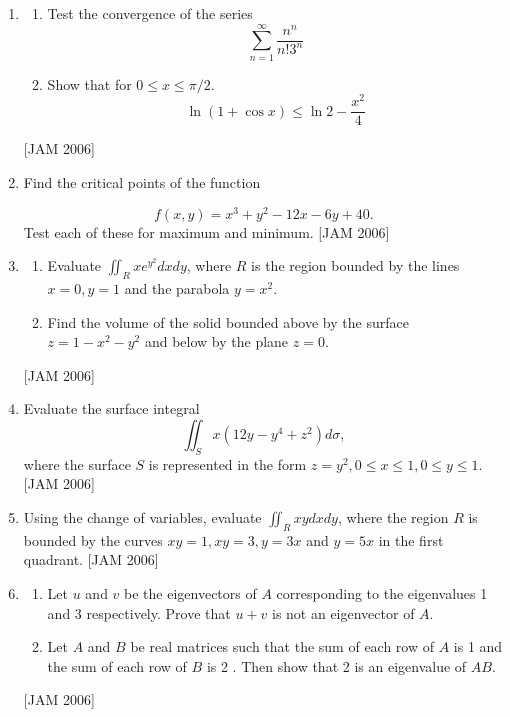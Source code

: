 \begin{enumerate}
\item 
\begin{enumerate}
  \item   Test the convergence of the series
$$
\sum_{n=1}^{\infty} \frac{n^{n}}{n ! 3^{n}}
$$
\item  Show that for $0 \leq x \leq \pi / 2$.
$$
\ln (1+\cos x) \leq \ln 2-\frac{x^{2}}{4}
$$
\end{enumerate}
 \hfill [JAM 2006]

 
\item Find the critical points of the function

$$
f(x, y)=x^{3}+y^{2}-12 x-6 y+40 .
$$
Test each of these for maximum and minimum.
 \hfill [JAM 2006]

 


\item 
\begin{enumerate}
  \item  Evaluate $\iint_{R} x e^{y^{2}} d x d y$, where $R$ is the region bounded by the lines $x=0, y=1$ and the parabola $y=x^{2}$.

\item Find the volume of the solid bounded above by the surface $z=1-x^{2}-y^{2}$ and below by the plane $z=0$.
\end{enumerate}
 \hfill [JAM 2006]



\item
Evaluate the surface integral
$$
\iint_{S} x\left(12 y-y^{4}+z^{2}\right) d \sigma,
$$
where the surface $S$ is represented in the form $z=y^{2}, 0 \leq x \leq 1,0 \leq y \leq 1$.
 \hfill [JAM 2006]

\item Using the change of variables, evaluate $\iint_{R} x y d x d y$, where the region $R$ is bounded by the curves $x y=1, x y=3, y=3 x$ and $y=5 x$ in the first quadrant.
 \hfill [JAM 2006]




\item 
\begin{enumerate}
\item  Let $u$ and $v$ be the eigenvectors of $A$ corresponding to the eigenvalues 1 and 3 respectively. Prove that $u+v$ is not an eigenvector of $A$.

\item  Let $A$ and $B$ be real matrices such that the sum of each row of $A$ is 1 and the sum of each row of $B$ is 2 . Then show that 2 is an eigenvalue of $A B$.
\end{enumerate}
 \hfill [JAM 2006]




\end{enumerate}
